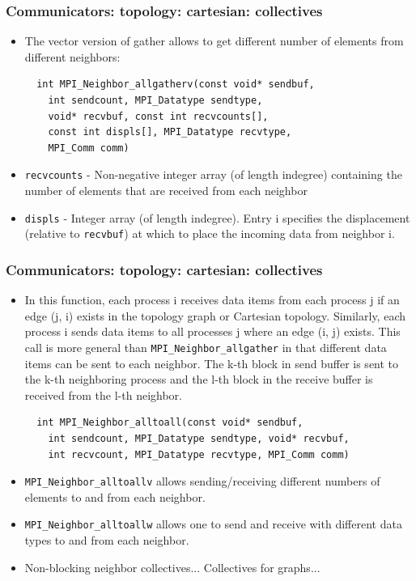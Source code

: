 \documentclass{beamer}
\begin{document}
\begin{frame}[fragile]
  \frametitle{Communicators: topology: cartesian: collectives}
\begin{itemize}
\item The vector version of gather allows to get different number of elements from different neighbors:
{\color{mycolorcode}
\begin{verbatim}
  int MPI_Neighbor_allgatherv(const void* sendbuf, 
    int sendcount, MPI_Datatype sendtype, 
    void* recvbuf, const int recvcounts[],
    const int displs[], MPI_Datatype recvtype, 
    MPI_Comm comm)
\end{verbatim}
}
\item {\color{mycolorcode}\verb|recvcounts|} - Non-negative integer array (of length indegree) containing
the number of elements that are received from
each neighbor
\item {\color{mycolorcode}\verb|displs|} - Integer array (of length indegree). Entry i specifies the
displacement (relative to {\color{mycolorcode}\verb|recvbuf|}) at which to place the
incoming data from neighbor i.
\end{itemize}
\end{frame}

\begin{frame}[fragile]
  \frametitle{Communicators: topology: cartesian: collectives}
\begin{itemize}
\item In this function, each process i receives data items from each process j if an edge (j, i)
exists in the topology graph or Cartesian topology. Similarly, each process i sends data
items to all processes j where an edge (i, j) exists. This call is more general than
{\color{mycolorcode}\verb|MPI_Neighbor_allgather|} in that different data items can be sent to each neighbor.
The k-th block in send buffer is sent to the k-th neighboring process and the l-th block in
the receive buffer is received from the l-th neighbor.
{\color{mycolorcode}
\begin{verbatim}
  int MPI_Neighbor_alltoall(const void* sendbuf, 
    int sendcount, MPI_Datatype sendtype, void* recvbuf, 
    int recvcount, MPI_Datatype recvtype, MPI_Comm comm)
\end{verbatim}
}
\item {\color{mycolorcode}\verb|MPI_Neighbor_alltoallv|} allows sending/receiving different
numbers of elements to and from each neighbor.
\item {\color{mycolorcode}\verb|MPI_Neighbor_alltoallw|} allows one to send and receive with different data types
to and from each neighbor.
\item Non-blocking neighbor collectives... Collectives for graphs...
\end{itemize}
\end{frame}
\end{document}
